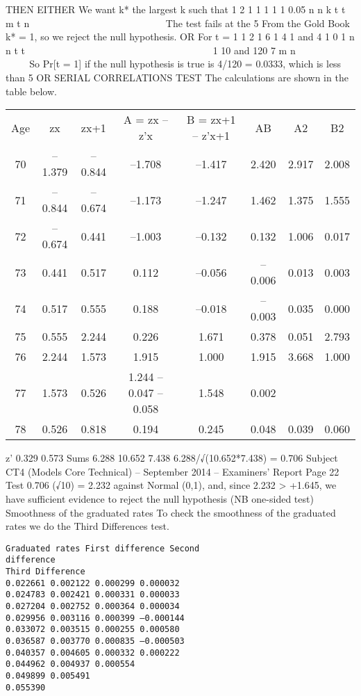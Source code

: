 \documentclass[a4paper,12pt]{article}
\begin{document}
THEN EITHER
We want k* the largest k such that
1 2
1
1 1
1
1
0.05
n n
k
t t
m
t n
    
      
 
  
 
 
The test fails at the 5%
From the Gold Book k* = 1, so we reject the null hypothesis.
OR
For t = 1
1 2 1 6 1 4
1 and 4
1 0 1
n n
t t
         
                     1
10
and 120
7
m
n
   
     
   
So Pr[t = 1] if the null hypothesis is true is
4/120 = 0.0333, which is less than 5%
OR SERIAL CORRELATIONS TEST
The calculations are shown in the table below.
\begin{center}
\begin{tabular}{cccc|cccc}
Age & zx & zx+1 & A = zx – z'x & B = zx+1 – z'x+1& AB & A2&  B2 \\
70 &–1.379 &–0.844 &–1.708 &–1.417 & 2.420 & 2.917 & 2.008\\
71 &–0.844 &–0.674& –1.173 &–1.247 & 1.462 & 1.375 & 1.555\\
72 & –0.674 & 0.441 &–1.003 &–0.132 & 0.132 & 1.006 & 0.017\\
73 & 0.441 & 0.517 & 0.112 &–0.056& –0.006 & 0.013 & 0.003\\
74 & 0.517 & 0.555 & 0.188 &–0.018& –0.003 & 0.035 & 0.000\\
75 & 0.555 & 2.244 & 0.226 & 1.671 & 0.378 & 0.051 & 2.793\\
76 & 2.244 & 1.573 & 1.915 & 1.000 & 1.915& 3.668 & 1.000\\
77 & 1.573 & 0.526 & 1.244 –0.047 –0.058 & 1.548 & 0.002\\
78 & 0.526 & 0.818 & 0.194 & 0.245 & 0.048 & 0.039 & 0.060\\
\end{tabular}
\end{center}



z' 0.329 0.573 Sums 6.288 10.652 7.438
6.288/√(10.652*7.438) = 0.706
Subject CT4 (Models Core Technical) – September 2014 – Examiners’ Report
Page 22
Test 0.706 (√10) = 2.232 against Normal (0,1), and, since
2.232 > +1.645, we have sufficient evidence to reject the null hypothesis (NB
one-sided test)
Smoothness of the graduated rates
To check the smoothness of the graduated rates we do the Third Differences
test.
\begin{verbatim}
Graduated rates First difference Second
difference
Third Difference
0.022661 0.002122 0.000299 0.000032
0.024783 0.002421 0.000331 0.000033
0.027204 0.002752 0.000364 0.000034
0.029956 0.003116 0.000399 –0.000144
0.033072 0.003515 0.000255 0.000580
0.036587 0.003770 0.000835 –0.000503
0.040357 0.004605 0.000332 0.000222
0.044962 0.004937 0.000554
0.049899 0.005491
0.055390
\end{verbatim}
\end{document}
